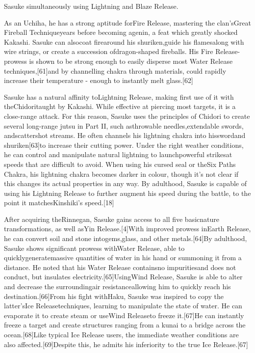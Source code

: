 \documentclass[a4paper,12pt]{article}
\begin{document}
Sasuke simultaneously using Lightning and Blaze Release.\\ \par \vspace{0.5cm}

As an Uchiha, he has a strong aptitude forFire Release, mastering the clan'sGreat Fireball Techniqueyears before becoming agenin, a feat which greatly shocked Kakashi. Sasuke can alsocoat firearound his shuriken,guide his flamesalong with wire strings, or create a succession ofdragon-shaped fireballs. His Fire Release-prowess is shown to be strong enough to easily disperse most Water Release techniques,[61]and by channelling chakra through materials, could rapidly increase their temperature - enough to instantly melt glass.[62]\\ \par \vspace{0.5cm}

Sasuke has a natural affinity toLightning Release, making first use of it with theChidoritaught by Kakashi. While effective at piercing most targets, it is a close-range attack. For this reason, Sasuke uses the principles of Chidori to create several long-range jutsu in Part II, such asthrowable needles,extendable swords, andscattershot streams. He often channels his lightning chakra into hisswordand shuriken[63]to increase their cutting power. Under the right weather conditions, he can control and manipulate natural lightning to launchpowerful strikesat speeds that are difficult to avoid. When using his cursed seal or theSix Paths Chakra, his lightning chakra becomes darker in colour, though it's not clear if this changes its actual properties in any way. By adulthood, Sasuke is capable of using his Lightning Release to further augment his speed during the battle, to the point it matchesKinshiki's speed.[18]\\ \par \vspace{0.5cm}

After acquiring theRinnegan, Sasuke gains access to all five basicnature transformations, as well asYin Release.[4]With improved prowess inEarth Release, he can convert soil and stone intogems,glass, and other metals.[64]By adulthood, Sasuke shows significant prowess withWater Release, able to quicklygeneratemassive quantities of water in his hand or summoning it from a distance. He noted that his Water Release containsno impuritiesand does not conduct, but insulates electricity.[65]UsingWind Release, Sasuke is able to alter and decrease the surroundingair resistanceallowing him to quickly reach his destination.[66]From his fight withHaku, Sasuke was inspired to copy the latter'sIce Releasetechniques, learning to manipulate the state of water. He can evaporate it to create steam or useWind Releaseto freeze it.[67]He can instantly freeze a target and create structures ranging from a kunai to a bridge across the ocean.[68]Like typical Ice Release users, the immediate weather conditions are also affected.[69]Despite this, he admits his inferiority to the true Ice Release.[67]\\ \par \vspace{0.5cm}
\end{document}

